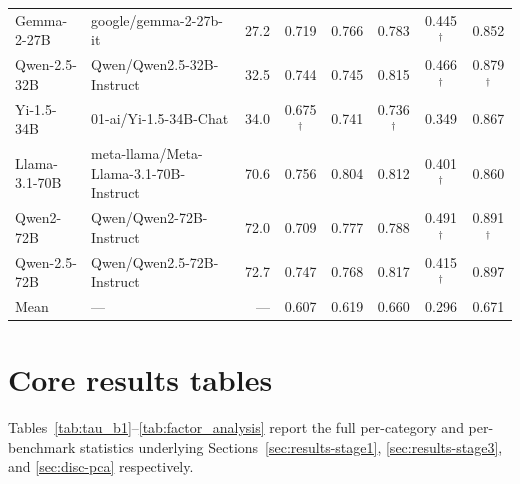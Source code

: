 \documentclass{article} %
\begin{document}
\begin{table}[H]
{\begin{tabular}{llrccccc}
Gemma-2-27B         & google/gemma-2-27b-it                       & 27.2 & 0.719            & 0.766            & 0.783            & 0.445$^\dagger$  & 0.852            \\
Qwen-2.5-32B        & Qwen/Qwen2.5-32B-Instruct                  & 32.5 & 0.744            & 0.745            & 0.815            & 0.466$^\dagger$  & 0.879$^\dagger$  \\
Yi-1.5-34B          & 01-ai/Yi-1.5-34B-Chat                      & 34.0 & 0.675$^\dagger$  & 0.741            & 0.736$^\dagger$  & 0.349            & 0.867            \\
Llama-3.1-70B       & meta-llama/Meta-Llama-3.1-70B-Instruct     & 70.6 & 0.756            & 0.804            & 0.812            & 0.401$^\dagger$  & 0.860            \\
Qwen2-72B           & Qwen/Qwen2-72B-Instruct                    & 72.0 & 0.709            & 0.777            & 0.788            & 0.491$^\dagger$  & 0.891$^\dagger$  \\
Qwen-2.5-72B        & Qwen/Qwen2.5-72B-Instruct                  & 72.7 & 0.747            & 0.768            & 0.817            & 0.415$^\dagger$  & 0.897            \\
\midrule
Mean                & ---                                         & ---  & 0.607            & 0.619            & 0.660            & 0.296            & 0.671            \\
\bottomrule
\end{tabular}%
}
\end{table}
 
\section{Core results tables}
\label{app:core-tables}
 
Tables~\ref{tab:tau_b1}--\ref{tab:factor_analysis} report the full per-category and per-benchmark statistics underlying Sections~\ref{sec:results-stage1}, \ref{sec:results-stage3}, and \ref{sec:disc-pca} respectively.
 
\end{document}
